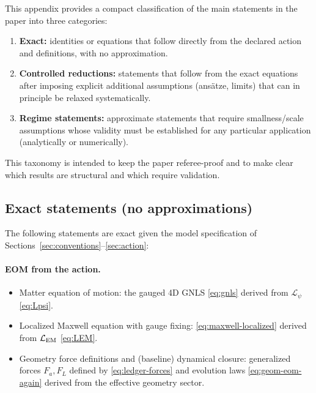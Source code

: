 \documentclass[11pt]{article}
\begin{document}
This appendix provides a compact classification of the main statements in the paper into three categories:
\begin{enumerate}[leftmargin=2.2em]
\item \textbf{Exact:} identities or equations that follow directly from the declared action and definitions, with no approximation.
\item \textbf{Controlled reductions:} statements that follow from the exact equations after imposing explicit additional assumptions (ans\"atze, limits) that can in principle be relaxed systematically.
\item \textbf{Regime statements:} approximate statements that require smallness/scale assumptions whose validity must be established for any particular application (analytically or numerically).
\end{enumerate}
This taxonomy is intended to keep the paper referee-proof and to make clear which results are structural and which require validation.

\subsection{Exact statements (no approximations)}
\label{app:claims-exact}

The following statements are exact given the model specification of Sections~\ref{sec:conventions}--\ref{sec:action}:

\paragraph{EOM from the action.}
\begin{itemize}[leftmargin=2.0em]
\item Matter equation of motion: the gauged 4D GNLS \eqref{eq:gnls} derived from $\mathcal L_\psi$ \eqref{eq:Lpsi}.
\item Localized Maxwell equation with gauge fixing: \eqref{eq:maxwell-localized} derived from $\mathcal L_{\rm EM}$ \eqref{eq:LEM}.
\item Geometry force definitions and (baseline) dynamical closure: generalized forces $F_a,F_L$ defined by \eqref{eq:ledger-forces} and evolution laws \eqref{eq:geom-eom-again} derived from the effective geometry sector.
\end{itemize}
\end{document}
